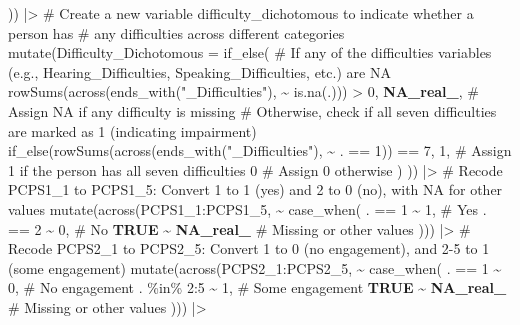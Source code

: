 \documentclass[
  bookmarksnumbered]{article}
\newenvironment{Shaded}{\begin{snugshade}}{\end{snugshade}}
\newcommand{\AttributeTok}[1]{\textcolor[rgb]{0.80,0.80,0.80}{#1}}
\newcommand{\CommentTok}[1]{\textcolor[rgb]{0.50,0.62,0.50}{#1}}
\newcommand{\ConstantTok}[1]{\textcolor[rgb]{0.86,0.64,0.64}{\textbf{#1}}}
\newcommand{\DecValTok}[1]{\textcolor[rgb]{0.86,0.86,0.80}{#1}}
\newcommand{\FunctionTok}[1]{\textcolor[rgb]{0.94,0.94,0.56}{#1}}
\newcommand{\NormalTok}[1]{\textcolor[rgb]{0.80,0.80,0.80}{#1}}
\newcommand{\SpecialCharTok}[1]{\textcolor[rgb]{0.86,0.64,0.64}{#1}}
\newcommand{\StringTok}[1]{\textcolor[rgb]{0.80,0.58,0.58}{#1}}
\begin{document}
\begin{Shaded}
\begin{Highlighting}[]
\NormalTok{  )) }\SpecialCharTok{|\textgreater{}}
  \CommentTok{\# Create a new variable \textquotesingle{}difficulty\_dichotomous\textquotesingle{} to indicate whether a person has}
  \CommentTok{\# any difficulties across different categories}
  \FunctionTok{mutate}\NormalTok{(}\AttributeTok{Difficulty\_Dichotomous =} \FunctionTok{if\_else}\NormalTok{(}
    \CommentTok{\# If any of the difficulties variables (e.g., Hearing\_Difficulties, Speaking\_Difficulties, etc.) are NA}
    \FunctionTok{rowSums}\NormalTok{(}\FunctionTok{across}\NormalTok{(}\FunctionTok{ends\_with}\NormalTok{(}\StringTok{"\_Difficulties"}\NormalTok{), }\SpecialCharTok{\textasciitilde{}} \FunctionTok{is.na}\NormalTok{(.))) }\SpecialCharTok{\textgreater{}} \DecValTok{0}\NormalTok{,}
    \ConstantTok{NA\_real\_}\NormalTok{, }\CommentTok{\# Assign NA if any difficulty is missing}
    \CommentTok{\# Otherwise, check if all seven difficulties are marked as \textquotesingle{}1\textquotesingle{} (indicating impairment)}
    \FunctionTok{if\_else}\NormalTok{(}\FunctionTok{rowSums}\NormalTok{(}\FunctionTok{across}\NormalTok{(}\FunctionTok{ends\_with}\NormalTok{(}\StringTok{"\_Difficulties"}\NormalTok{), }\SpecialCharTok{\textasciitilde{}}\NormalTok{ . }\SpecialCharTok{==} \DecValTok{1}\NormalTok{)) }\SpecialCharTok{==} \DecValTok{7}\NormalTok{,}
            \DecValTok{1}\NormalTok{, }\CommentTok{\# Assign 1 if the person has all seven difficulties}
            \DecValTok{0} \CommentTok{\# Assign 0 otherwise}
\NormalTok{    )}
\NormalTok{  )) }\SpecialCharTok{|\textgreater{}}
  \CommentTok{\# Recode PCPS1\_1 to PCPS1\_5: Convert 1 to 1 (yes) and 2 to 0 (no), with NA for other values}
  \FunctionTok{mutate}\NormalTok{(}\FunctionTok{across}\NormalTok{(PCPS1\_1}\SpecialCharTok{:}\NormalTok{PCPS1\_5, }\SpecialCharTok{\textasciitilde{}} \FunctionTok{case\_when}\NormalTok{(}
\NormalTok{    . }\SpecialCharTok{==} \DecValTok{1} \SpecialCharTok{\textasciitilde{}} \DecValTok{1}\NormalTok{, }\CommentTok{\# Yes}
\NormalTok{    . }\SpecialCharTok{==} \DecValTok{2} \SpecialCharTok{\textasciitilde{}} \DecValTok{0}\NormalTok{, }\CommentTok{\# No}
    \ConstantTok{TRUE} \SpecialCharTok{\textasciitilde{}} \ConstantTok{NA\_real\_} \CommentTok{\# Missing or other values}
\NormalTok{  ))) }\SpecialCharTok{|\textgreater{}}
  \CommentTok{\# Recode PCPS2\_1 to PCPS2\_5: Convert 1 to 0 (no engagement), and 2{-}5 to 1 (some engagement)}
  \FunctionTok{mutate}\NormalTok{(}\FunctionTok{across}\NormalTok{(PCPS2\_1}\SpecialCharTok{:}\NormalTok{PCPS2\_5, }\SpecialCharTok{\textasciitilde{}} \FunctionTok{case\_when}\NormalTok{(}
\NormalTok{    . }\SpecialCharTok{==} \DecValTok{1} \SpecialCharTok{\textasciitilde{}} \DecValTok{0}\NormalTok{, }\CommentTok{\# No engagement}
\NormalTok{    . }\SpecialCharTok{\%in\%} \DecValTok{2}\SpecialCharTok{:}\DecValTok{5} \SpecialCharTok{\textasciitilde{}} \DecValTok{1}\NormalTok{, }\CommentTok{\# Some engagement}
    \ConstantTok{TRUE} \SpecialCharTok{\textasciitilde{}} \ConstantTok{NA\_real\_} \CommentTok{\# Missing or other values}
\NormalTok{  ))) }\SpecialCharTok{|\textgreater{}}
  

\end{Highlighting}
\end{Shaded}
\end{document}
